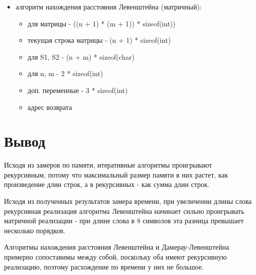 \begin{itemize}
    \item алгоритм нахождения расстояния Левенштейна (матричный):

    \begin{itemize}
        \item для матрицы - ((n + 1) * (m + 1)) * sizeof(int)) 
        \item текущая строка матрицы - (n + 1) * sizeof(int)
        \item для S1, S2 - (n + m) * sizeof(char)
        \item для n, m - 2 * sizeof(int)
        \item доп. переменные - 3 * sizeof(int)
        \item адрес возврата
    \end{itemize}
\end{itemize}

\section*{Вывод}

Исходя из замеров по памяти, итеративные алгоритмы проигрывают рекурсивным, потому что максимальный размер памяти в них растет, как произведение длин строк, а в рекурсивных - как сумма длин строк.

Исходя из полученных результатов замера времени, при увеличении длины слова рекурсивная реализация алгоритма Левенштейна начинает сильно проигрывать матричной реализации - при длине слова в 8 символов эта разница превышает несколько порядков.

Алгоритмы нахождения расстояния Левенштейна и Дамерау-Левенштейна примерно сопоставимы между собой, поскольку оба имеют рекурсивную реализацию, поэтому расхождение по времени у них не большое.
